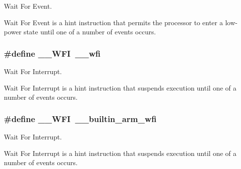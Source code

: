 Wait For Event. 

Wait For Event is a hint instruction that permits the processor to enter a low-\/power state until one of a number of events occurs. \hypertarget{group___c_m_s_i_s___core___instruction_interface_gad23bf2b78a9a4524157c9de0d30b7448}{
\subsubsection[{\-\_\-\-\_\-\-W\-F\-I}]{\setlength{\rightskip}{0pt plus 5cm}\#define \-\_\-\-\_\-\-W\-F\-I~\-\_\-\-\_\-wfi}}\label{group___c_m_s_i_s___core___instruction_interface_gad23bf2b78a9a4524157c9de0d30b7448}


Wait For Interrupt. 

Wait For Interrupt is a hint instruction that suspends execution until one of a number of events occurs. \hypertarget{group___c_m_s_i_s___core___instruction_interface_gad23bf2b78a9a4524157c9de0d30b7448}{
\subsubsection[{\-\_\-\-\_\-\-W\-F\-I}]{\setlength{\rightskip}{0pt plus 5cm}\#define \-\_\-\-\_\-\-W\-F\-I~\-\_\-\-\_\-builtin\-\_\-arm\-\_\-wfi}}\label{group___c_m_s_i_s___core___instruction_interface_gad23bf2b78a9a4524157c9de0d30b7448}


Wait For Interrupt. 

Wait For Interrupt is a hint instruction that suspends execution until one of a number of events occurs. 


